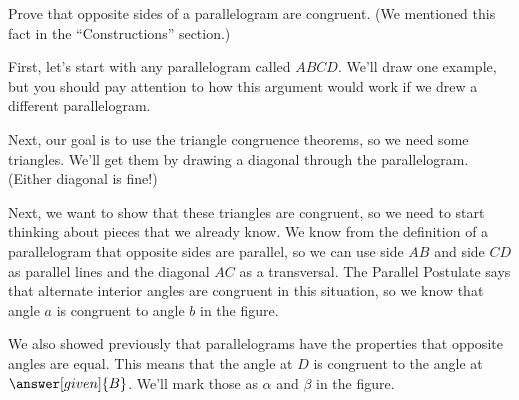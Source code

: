 \documentclass{ximera}
\begin{document}
\begin{example}
Prove that opposite sides of a parallelogram are congruent. (We mentioned this fact in the ``Constructions'' section.)

First, let's start with any parallelogram called $ABCD$. We'll draw one example, but you should pay attention to how this argument would work if we drew a different parallelogram.
\begin{image}\end{image}
Next, our goal is to use the triangle congruence theorems, so we need some triangles. We'll get them by drawing a diagonal through the parallelogram. (Either diagonal is fine!)
\begin{image}\end{image}
Next, we want to show that these triangles are congruent, so we need to start thinking about pieces that we already know. We know from the definition of a parallelogram that opposite sides are parallel, so we can use side $AB$ and side $CD$ as parallel lines and the diagonal $AC$ as a transversal. The Parallel Postulate says that alternate interior angles are congruent in this situation, so we know that angle $a$ is congruent to angle $b$ in the figure.
\begin{image}\end{image}
We also showed previously that parallelograms have the properties that opposite angles are equal. This means that the angle at $D$ is congruent to the angle at $\answer[given]{B}$. We'll mark those as $\alpha$ and $\beta$ in the figure.
\begin{image}\begin{tikzpicture}

\end{tikzpicture}
\end{image}
\end{example}
\end{document}
